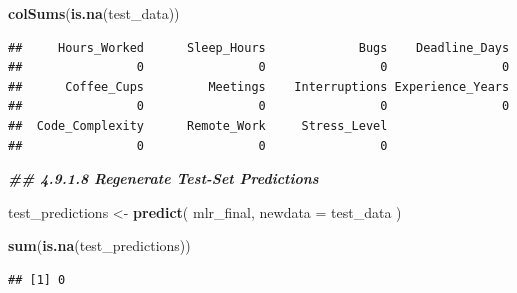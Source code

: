 \documentclass[
]{article}
\newenvironment{Shaded}{\begin{snugshade}}{\end{snugshade}}
\newcommand{\AttributeTok}[1]{\textcolor[rgb]{0.13,0.29,0.53}{#1}}
\newcommand{\DecValTok}[1]{\textcolor[rgb]{0.00,0.00,0.81}{#1}}
\newcommand{\DocumentationTok}[1]{\textcolor[rgb]{0.56,0.35,0.01}{\textbf{\textit{#1}}}}
\newcommand{\FunctionTok}[1]{\textcolor[rgb]{0.13,0.29,0.53}{\textbf{#1}}}
\newcommand{\NormalTok}[1]{#1}
\newcommand{\OtherTok}[1]{\textcolor[rgb]{0.56,0.35,0.01}{#1}}
\newcommand{\SpecialCharTok}[1]{\textcolor[rgb]{0.81,0.36,0.00}{\textbf{#1}}}
\begin{document}
\begin{Shaded}
\begin{Highlighting}[]
\FunctionTok{colSums}\NormalTok{(}\FunctionTok{is.na}\NormalTok{(test\_data))}
\end{Highlighting}
\end{Shaded}

\begin{verbatim}
##     Hours_Worked      Sleep_Hours             Bugs    Deadline_Days 
##                0                0                0                0 
##      Coffee_Cups         Meetings    Interruptions Experience_Years 
##                0                0                0                0 
##  Code_Complexity      Remote_Work     Stress_Level 
##                0                0                0
\end{verbatim}

\begin{Shaded}
\begin{Highlighting}[]
\DocumentationTok{\#\# 4.9.1.8 Regenerate Test{-}Set Predictions}

\NormalTok{test\_predictions }\OtherTok{\textless{}{-}} \FunctionTok{predict}\NormalTok{(}
\NormalTok{  mlr\_final,}
  \AttributeTok{newdata =}\NormalTok{ test\_data}
\NormalTok{)}

\FunctionTok{sum}\NormalTok{(}\FunctionTok{is.na}\NormalTok{(test\_predictions))}
\end{Highlighting}
\end{Shaded}

\begin{verbatim}
## [1] 0
\end{verbatim}

\begin{Shaded}
\end{Shaded}
\end{document}
